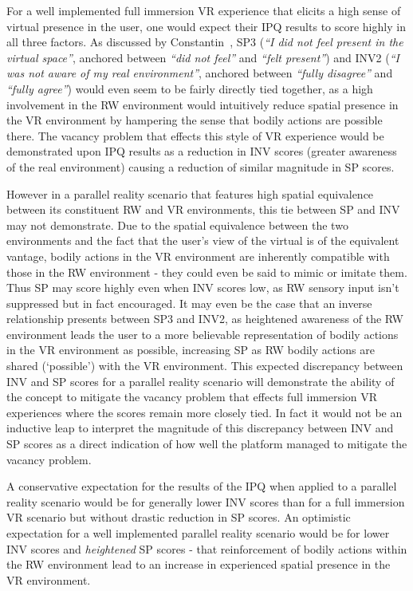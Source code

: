 For a well implemented full immersion VR experience that elicits a high sense of virtual presence in the user, one would expect their IPQ results to score highly in all three factors. As discussed by Constantin~\cite{Constantin2003}, SP3 (\textit{``I did not feel present in the virtual space''}, anchored between \textit{``did not feel''} and \textit{``felt present''}) and INV2 (\textit{``I was not aware of my real environment''}, anchored between \textit{``fully disagree''} and \textit{``fully agree''}) would even seem to be fairly directly tied together, as a high involvement in the RW environment would intuitively reduce spatial presence in the VR environment by hampering the sense that bodily actions are possible there. The vacancy problem that effects this style of VR experience would be demonstrated upon IPQ results as a reduction in INV scores (greater awareness of the real environment) causing a reduction of similar magnitude in SP scores.

However in a parallel reality scenario that features high spatial equivalence between its constituent RW and VR environments, this tie between SP and INV may not demonstrate. Due to the spatial equivalence between the two environments and the fact that the user's view of the virtual is of the equivalent vantage, bodily actions in the VR environment are inherently compatible with those in the RW environment - they could even be said to mimic or imitate them. Thus SP may score highly even when INV scores low, as RW sensory input isn't suppressed but in fact encouraged. It may even be the case that an inverse relationship presents between SP3 and INV2, as heightened awareness of the RW environment leads the user to a more believable representation of bodily actions in the VR environment as possible, increasing SP as RW bodily actions are shared (`possible') with the VR environment. This expected discrepancy between INV and SP scores for a parallel reality scenario will demonstrate the ability of the concept to mitigate the vacancy problem that effects full immersion VR experiences where the scores remain more closely tied. In fact it would not be an inductive leap to interpret the magnitude of this discrepancy between INV and SP scores as a direct indication of how well the platform managed to mitigate the vacancy problem.

A conservative expectation for the results of the IPQ when applied to a parallel reality scenario would be for generally lower INV scores than for a full immersion VR scenario but without drastic reduction in SP scores. An optimistic expectation for a well implemented parallel reality scenario would be for lower INV scores and \textit{heightened} SP scores - that reinforcement of bodily actions within the RW environment lead to an increase in experienced spatial presence in the VR environment.

